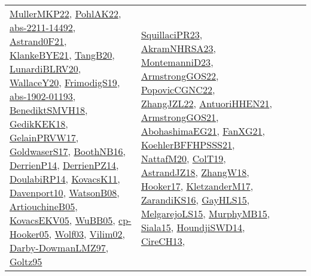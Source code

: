 {\begin{longtable}{llp{6cm}p{6cm}p{6cm}}
\href{articles/MullerMKP22.pdf}{MullerMKP22}\cite{MullerMKP22}, \href{articles/PohlAK22.pdf}{PohlAK22}\cite{PohlAK22}, \href{articles/abs-2211-14492.pdf}{abs-2211-14492}\cite{abs-2211-14492}, \href{papers/Astrand0F21.pdf}{Astrand0F21}\cite{Astrand0F21}, \href{papers/KlankeBYE21.pdf}{KlankeBYE21}\cite{KlankeBYE21}, \href{papers/TangB20.pdf}{TangB20}\cite{TangB20}, \href{articles/LunardiBLRV20.pdf}{LunardiBLRV20}\cite{LunardiBLRV20}, \href{articles/WallaceY20.pdf}{WallaceY20}\cite{WallaceY20}, \href{papers/FrimodigS19.pdf}{FrimodigS19}\cite{FrimodigS19}, \href{articles/abs-1902-01193.pdf}{abs-1902-01193}\cite{abs-1902-01193}, \href{papers/BenediktSMVH18.pdf}{BenediktSMVH18}\cite{BenediktSMVH18}, \href{articles/GedikKEK18.pdf}{GedikKEK18}\cite{GedikKEK18}, \href{papers/GelainPRVW17.pdf}{GelainPRVW17}\cite{GelainPRVW17}, \href{papers/GoldwaserS17.pdf}{GoldwaserS17}\cite{GoldwaserS17}, \href{papers/BoothNB16.pdf}{BoothNB16}\cite{BoothNB16}, \href{papers/DerrienP14.pdf}{DerrienP14}\cite{DerrienP14}, \href{papers/DerrienPZ14.pdf}{DerrienPZ14}\cite{DerrienPZ14}, \href{papers/DoulabiRP14.pdf}{DoulabiRP14}\cite{DoulabiRP14}, \href{articles/KovacsK11.pdf}{KovacsK11}\cite{KovacsK11}, \href{papers/Davenport10.pdf}{Davenport10}\cite{Davenport10}, \href{papers/WatsonB08.pdf}{WatsonB08}\cite{WatsonB08}, \href{papers/ArtiouchineB05.pdf}{ArtiouchineB05}\cite{ArtiouchineB05}, \href{papers/KovacsEKV05.pdf}{KovacsEKV05}\cite{KovacsEKV05}, \href{papers/WuBB05.pdf}{WuBB05}\cite{WuBB05}, \href{papers/cp-Hooker05.pdf}{cp-Hooker05}\cite{cp-Hooker05}, \href{papers/Wolf03.pdf}{Wolf03}\cite{Wolf03}, \href{papers/Vilim02.pdf}{Vilim02}\cite{Vilim02}, \href{articles/Darby-DowmanLMZ97.pdf}{Darby-DowmanLMZ97}\cite{Darby-DowmanLMZ97}, \href{papers/Goltz95.pdf}{Goltz95}\cite{Goltz95} & \href{papers/SquillaciPR23.pdf}{SquillaciPR23}\cite{SquillaciPR23}, \href{articles/AkramNHRSA23.pdf}{AkramNHRSA23}\cite{AkramNHRSA23}, \href{articles/MontemanniD23.pdf}{MontemanniD23}\cite{MontemanniD23}, \href{papers/ArmstrongGOS22.pdf}{ArmstrongGOS22}\cite{ArmstrongGOS22}, \href{papers/PopovicCGNC22.pdf}{PopovicCGNC22}\cite{PopovicCGNC22}, \href{papers/ZhangJZL22.pdf}{ZhangJZL22}\cite{ZhangJZL22}, \href{papers/AntuoriHHEN21.pdf}{AntuoriHHEN21}\cite{AntuoriHHEN21}, \href{papers/ArmstrongGOS21.pdf}{ArmstrongGOS21}\cite{ArmstrongGOS21}, \href{articles/AbohashimaEG21.pdf}{AbohashimaEG21}\cite{AbohashimaEG21}, \href{articles/FanXG21.pdf}{FanXG21}\cite{FanXG21}, \href{articles/KoehlerBFFHPSSS21.pdf}{KoehlerBFFHPSSS21}\cite{KoehlerBFFHPSSS21}, \href{papers/NattafM20.pdf}{NattafM20}\cite{NattafM20}, \href{papers/ColT19.pdf}{ColT19}\cite{ColT19}, \href{papers/AstrandJZ18.pdf}{AstrandJZ18}\cite{AstrandJZ18}, \href{articles/ZhangW18.pdf}{ZhangW18}\cite{ZhangW18}, \href{papers/Hooker17.pdf}{Hooker17}\cite{Hooker17}, \href{papers/KletzanderM17.pdf}{KletzanderM17}\cite{KletzanderM17}, \href{articles/ZarandiKS16.pdf}{ZarandiKS16}\cite{ZarandiKS16}, \href{papers/GayHLS15.pdf}{GayHLS15}\cite{GayHLS15}, \href{papers/MelgarejoLS15.pdf}{MelgarejoLS15}\cite{MelgarejoLS15}, \href{papers/MurphyMB15.pdf}{MurphyMB15}\cite{MurphyMB15}, \href{articles/Siala15.pdf}{Siala15}\cite{Siala15}, \href{papers/HoundjiSWD14.pdf}{HoundjiSWD14}\cite{HoundjiSWD14}, \href{papers/CireCH13.pdf}{CireCH13}\cite{CireCH13}, 
\end{longtable}}
